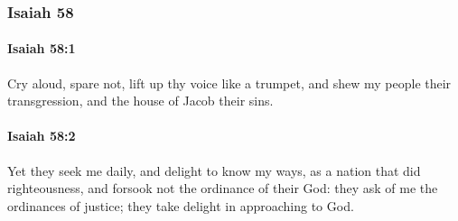 	\subsubsection{Isaiah 58} %
		\label{ISAIAH-58}

		\paragraph{Isaiah 58:1} %
			\label{ISAIAH-58-1}

			Cry aloud, spare not, lift up thy voice like a trumpet, and shew my people their transgression, and the house of Jacob their sins.


		\paragraph{Isaiah 58:2} %
			\label{ISAIAH-58-2}

			Yet they seek me daily, and delight to know my ways, as a nation that did righteousness, and forsook not the ordinance of their God: they ask of me the ordinances of justice; they take delight in approaching to God.

